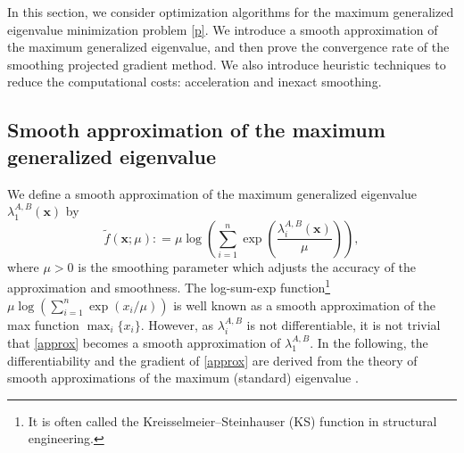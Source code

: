 \documentclass[sn-mathphys,Numbered]{sn-jnl}%
\theoremstyle{thmstyleone}%
\theoremstyle{thmstyletwo}%
\theoremstyle{thmstylethree}%
\newcommand{\e}[1]{\begin{equation}#1\end{equation}}
\def\coloneq{\mathrel{\mathop:}=}
\def\lamx{\lambda^{A,B}_1(\boldsymbol{x})}
\def\lamxi{\lambda^{A,B}_i(\boldsymbol{x})}
\begin{document}
In this section, we consider optimization algorithms for the maximum generalized eigenvalue minimization problem \eqref{p}. We introduce a smooth approximation of the maximum generalized eigenvalue, and then prove the convergence rate of the smoothing projected gradient method. We also introduce heuristic techniques to reduce the computational costs: acceleration and inexact smoothing.

\subsection{Smooth approximation of the maximum generalized eigenvalue}

We define a smooth approximation of the maximum generalized eigenvalue $\lamx$ by
\e{
\tilde{f}(\bm{x};\mu)\coloneq\mu\log\left(\sum_{i=1}^n \exp{\left(\frac{\lamxi}{\mu}\right)}\right),
\label{approx}
}
where $\mu>0$ is the smoothing parameter which adjusts the accuracy of the approximation and smoothness. The log-sum-exp function\footnote{It is often called the Kreisselmeier--Steinhauser (KS) function \cite{kreisselmeier80} in structural engineering.} $\mu\log\left(\sum_{i=1}^n \exp{\left(x_i/\mu\right)}\right)$ is well known as a smooth approximation of the max function $\max_i \{x_i\}$. However, as $\lambda_i^{A,B}$ is not differentiable, it is not trivial that \eqref{approx} becomes a smooth approximation of $\lambda_1^{A,B}$. In the following, the differentiability and the gradient of \eqref{approx} are derived from the theory of smooth approximations of the maximum (standard) eigenvalue \cite{beck17,nesterov07}.
\end{document}
